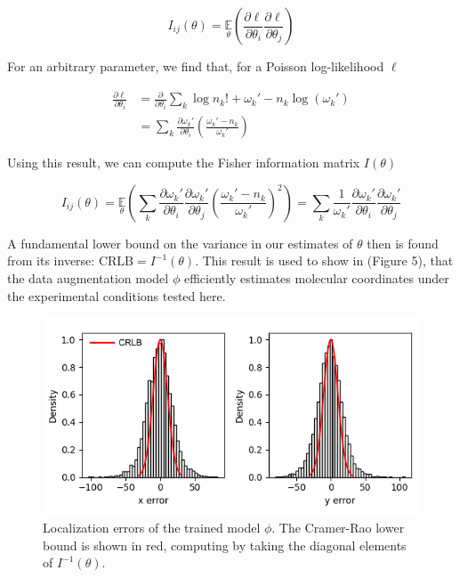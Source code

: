 \documentclass{article}
\begin{document}
\begin{equation}
I_{ij}(\theta) = \underset{\theta}{\mathbb{E}}\left(\frac{\partial \ell}{\partial\theta_{i}}\frac{\partial\ell}{\partial\theta_{j}}\right) 
\end{equation}

For an arbitrary parameter, we find that, for a Poisson log-likelihood $\ell$

\begin{align*}
\frac{\partial \ell}{\partial \theta_{i}} &= \frac{\partial}{\partial \theta_{i}} \sum_{k}  \log n_{k}! + \omega_{k}' - n_{k}\log\left(\omega_{k}'\right)\\
&= \sum_{k} \frac{\partial \omega_{k}'}{\partial\theta_{i}} \left(\frac{\omega_{k}'-n_{k}}{\omega_{k}'}\right)
\end{align*}

Using this result, we can compute the Fisher information matrix $I(\theta)$

\begin{equation*}
I_{ij}(\theta) = \underset{\theta}{\mathbb{E}}\left(\sum_{k}\frac{\partial \omega_{k}'}{\partial\theta_{i}}\frac{\partial \omega_{k}'}{\partial\theta_{j}} \left(\frac{\omega_{k}'-n_{k}}{\omega_{k}'}\right)^{2}\right) = \sum_{k}\frac{1}{\omega_{k}'}\frac{\partial \omega_{k}'}{\partial\theta_{i}}\frac{\partial \omega_{k}'}{\partial\theta_{j}}
\end{equation*}

A fundamental lower bound on the variance in our estimates of $\theta$ then is found from its inverse: $\mathrm{CRLB} = I^{-1}(\theta)$. This result is used to show in (Figure 5), that the data augmentation model $\phi$ efficiently estimates molecular coordinates under the experimental conditions tested here. 

\begin{figure}
\centering
\includegraphics[scale=0.7]{media/Errors.png}
\caption{Localization errors of the trained model $\phi$. The Cramer-Rao lower bound is shown in red, computing by taking the diagonal elements of $I^{-1}(\theta)$.}
\end{figure}
\end{document}
